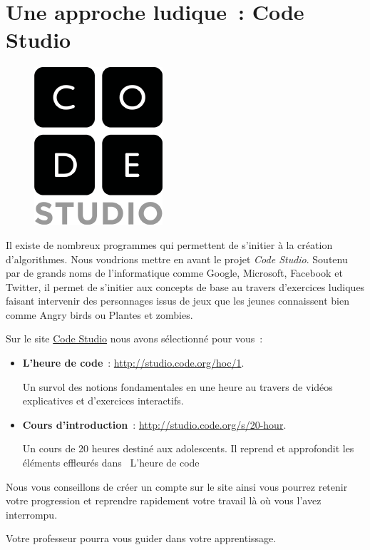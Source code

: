 \chapter{Une approche ludique~: Code Studio}

	\begin{figure}
	\vskip-4mm
	\includegraphics[scale=0.2]{images/codeorg-studio-logo.png}
	\vskip-2mm
	\end{figure}
	
	Il existe de nombreux programmes 
	qui permettent de s’initier à la création d’algorithmes.
	Nous voudrions mettre en avant le projet \emph{Code Studio}.
	Soutenu par de grands noms de l’informatique 
	comme \textsf{Google}, \textsf{Microsoft}, 
	\textsf{Facebook} et \textsf{Twitter},
	il permet de s’initier aux concepts de base
	au travers d’exercices ludiques faisant intervenir 
	des personnages issus de jeux que les jeunes connaissent bien 
	comme \textsf{Angry birds} ou \textsf{Plantes et zombies}.
	
	Sur le site \href{http://studio.code.org/}{Code Studio} 
	nous avons sélectionné pour vous~:

	\begin{itemize}
	\item
		\textbf{L’heure de code}~: 
		\url{http://studio.code.org/hoc/1}.
		
		Un survol des notions fondamentales en une heure
		au travers de vidéos explicatives et d’exercices interactifs.
	\item
		\textbf{Cours d’introduction}~: 
		\url{http://studio.code.org/s/20-hour}.
		
		Un cours de 20 heures destiné aux adolescents.
		Il reprend et approfondit les éléments effleurés dans
		\og\ L’heure de code\fg	
	\end{itemize}
	
	Nous vous conseillons de créer un compte sur le site
	ainsi vous pourrez retenir votre progression
	et reprendre rapidement votre travail là où vous l’avez
	interrompu.
	
	Votre professeur pourra vous guider dans votre apprentissage.
	
